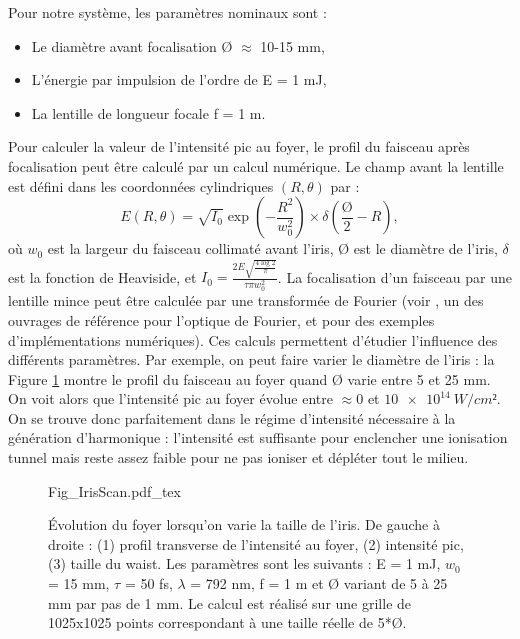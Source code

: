 Pour notre système, les paramètres nominaux sont :
\begin{itemize}
\item Le diamètre avant focalisation \O{} $\approx$ 10-15 mm,
\item L'énergie par impulsion de l'ordre de E = 1 mJ,
\item La lentille de longueur focale f = 1 m. \\
\end{itemize}
Pour calculer la valeur de l'intensité pic au foyer, le profil du faisceau après focalisation peut être calculé par un calcul numérique. Le champ avant la lentille est défini dans les coordonnées cylindriques $(R,\theta)$ par :
\begin{equation*}
E(R,\theta) = \sqrt{I_0} \exp{\left(-\frac{R^2}{w_0^2}\right)}\times\delta(\frac{\mbox{\O}}{2}-R),
\end{equation*}
où $w_0$ est la largeur du faisceau collimaté avant l'iris, \O{}  est le diamètre de l'iris, $\delta$ est la fonction de Heaviside, et $I_0 = \frac{2E\sqrt{\frac{4\log{2}}{\pi}}}{\tau\pi w_0^2}$.
La focalisation d'un faisceau par une lentille mince peut être calculée par une transformée de Fourier (voir , un des ouvrages de référence pour l'optique de Fourier, et  pour des exemples d'implémentations numériques). Ces calculs permettent d'étudier l'influence des différents paramètres. Par exemple, on peut faire varier le diamètre de l'iris : la Figure \ref{Fig:IrisScan} montre le profil du faisceau au foyer quand \O{} varie entre 5 et 25 mm. On voit alors que l'intensité pic au foyer évolue entre $\approx$0 et $\SI{10e14}{W/cm²}$. On se trouve donc parfaitement dans le régime d'intensité nécessaire à la génération d'harmonique : l'intensité est suffisante pour enclencher une ionisation tunnel mais reste assez faible pour ne pas ioniser et dépléter tout le milieu.

\begin{figure}[!ht]
\centering
\def\svgwidth{\columnwidth}
{Fig_IrisScan.pdf_tex}
\caption{\'{E}volution du foyer lorsqu'on varie la taille de l'iris. De gauche à droite : (1) profil transverse de l'intensité au foyer, (2) intensité pic, (3) taille du waist. Les paramètres sont les suivants : E = 1 mJ, $w_0$ = 15 mm, $\tau$ = 50 fs, $\lambda$ = 792 nm, f = 1 m et \O{} variant de 5 à 25 mm par pas de 1 mm. Le calcul est réalisé sur une grille de 1025x1025 points correspondant à une taille réelle de 5*\O{}.}
\label{Fig:IrisScan}
\end{figure}


